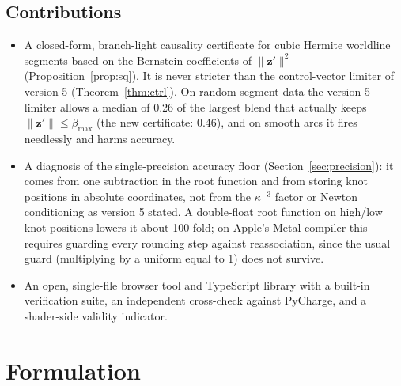 \documentclass[11pt, a4paper]{article}
\begin{document}
\subsection*{Contributions}
\begin{itemize}
    \item A closed-form, branch-light causality certificate for cubic Hermite worldline segments based on the Bernstein coefficients of $\|\mathbf{z}'\|^2$ (Proposition~\ref{prop:sq}). It is never stricter than the control-vector limiter of version 5 (Theorem~\ref{thm:ctrl}). On random segment data the version-5 limiter allows a median of 0.26 of the largest blend that actually keeps $\|\mathbf{z}'\| \le \beta_{\max}$ (the new certificate: 0.46), and on smooth arcs it fires needlessly and harms accuracy.
    \item A diagnosis of the single-precision accuracy floor (Section~\ref{sec:precision}): it comes from one subtraction in the root function and from storing knot positions in absolute coordinates, not from the $\kappa^{-3}$ factor or Newton conditioning as version 5 stated. A double-float root function on high/low knot positions lowers it about 100-fold; on Apple's Metal compiler this requires guarding every rounding step against reassociation, since the usual guard (multiplying by a uniform equal to 1) does not survive.
    \item An open, single-file browser tool and TypeScript library with a built-in verification suite, an independent cross-check against PyCharge, and a shader-side validity indicator.
\end{itemize}

\section{Formulation}
\end{document}
